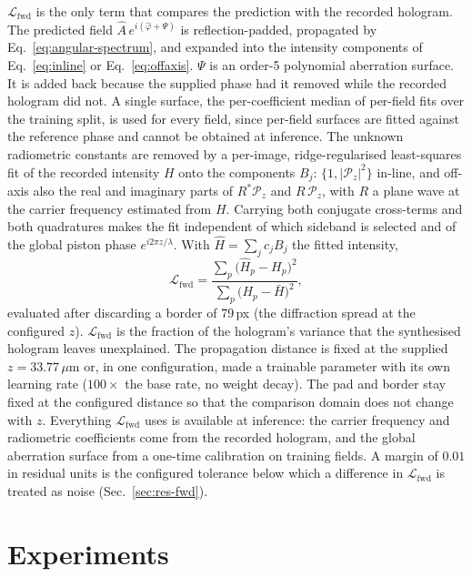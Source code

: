 \documentclass[11pt]{article}
\newcommand{\Lfwd}{\mathcal{L}_\mathrm{fwd}}
\begin{document}
$\Lfwd$ is the only term that compares the prediction with the recorded
hologram. The predicted field $\hat A\,e^{i(\hat\varphi+\Psi)}$ is
reflection-padded, propagated by Eq.~\eqref{eq:angular-spectrum}, and expanded
into the intensity components of Eq.~\eqref{eq:inline} or
Eq.~\eqref{eq:offaxis}. $\Psi$ is an order-5 polynomial aberration surface. It
is added back because the supplied phase had it removed while the recorded
hologram did not. A single surface, the per-coefficient median of per-field
fits over the training split, is used for every field, since per-field surfaces
are fitted against the reference phase and cannot be obtained at inference.
The unknown radiometric constants are removed by a per-image, ridge-regularised
least-squares fit of the recorded intensity $H$ onto the components $B_j$:
$\{1,|\mathcal{P}_z|^2\}$ in-line, and off-axis also the real and
imaginary parts of $R^{*}\mathcal{P}_z$ and $R\,\mathcal{P}_z$, with $R$ a plane
wave at the carrier frequency estimated from $H$. Carrying both conjugate
cross-terms and both quadratures makes the fit independent of which sideband is
selected and of the global piston phase $e^{i2\pi z/\lambda}$. With
$\hat H = \sum_j c_j B_j$ the fitted intensity,
\begin{equation}
\Lfwd = \frac{\sum_{p}\big(\hat H_p - H_p\big)^2}
             {\sum_{p}\big(H_p-\bar H\big)^2} ,
\label{eq:lfwd}
\end{equation}
evaluated after discarding a border of 79\,px (the diffraction spread at the
configured $z$). $\Lfwd$ is the fraction of the hologram's variance that the
synthesised hologram leaves unexplained. The propagation distance is fixed at
the supplied $z=33.77\,\mu$m or, in one configuration, made a trainable
parameter with its own learning rate ($100\times$ the base rate, no weight
decay). The pad and border stay fixed at the configured distance so that the
comparison domain does not change with $z$. Everything $\Lfwd$ uses is
available at inference: the carrier frequency and radiometric coefficients come
from the recorded hologram, and the global aberration surface from a one-time
calibration on training fields. A margin of $0.01$ in residual units is the
configured tolerance below which a difference in $\Lfwd$ is treated as noise
(Sec.~\ref{sec:res-fwd}).

\section{Experiments}
\label{sec:experiments}
\end{document}
